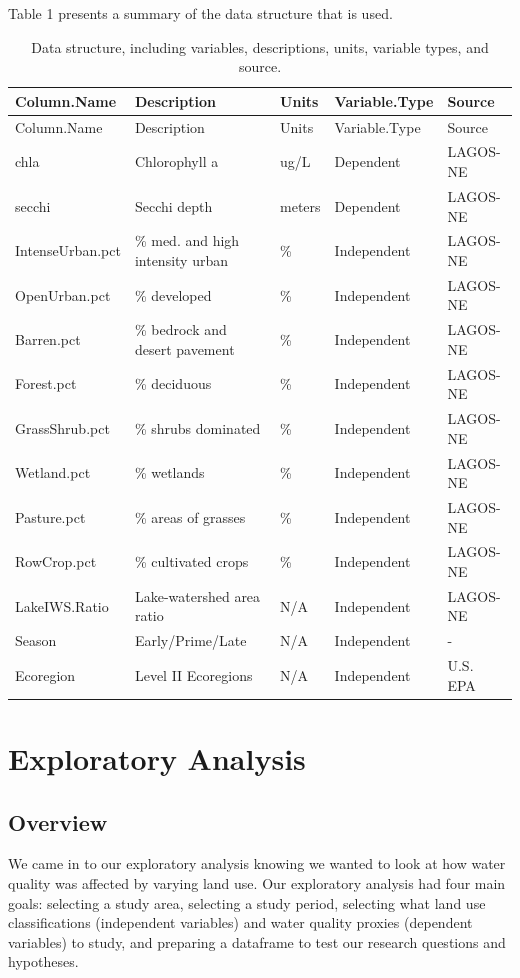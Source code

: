 \documentclass[12pt,]{article}
\begin{document}
Table 1 presents a summary of the data structure that is used.

\begin{longtable}[]{@{}lllll@{}}
\caption{Data structure, including variables, descriptions, units,
variable types, and source.}\tabularnewline
\toprule
Column.Name & Description & Units & Variable.Type &
Source\tabularnewline
\midrule
\endfirsthead
\toprule
Column.Name & Description & Units & Variable.Type &
Source\tabularnewline
\midrule
\endhead
chla & Chlorophyll a & ug/L & Dependent & LAGOS-NE\tabularnewline
secchi & Secchi depth & meters & Dependent & LAGOS-NE\tabularnewline
IntenseUrban.pct & \% med. and high intensity urban & \% & Independent &
LAGOS-NE\tabularnewline
OpenUrban.pct & \% developed & \% & Independent &
LAGOS-NE\tabularnewline
Barren.pct & \% bedrock and desert pavement & \% & Independent &
LAGOS-NE\tabularnewline
Forest.pct & \% deciduous & \% & Independent & LAGOS-NE\tabularnewline
GrassShrub.pct & \% shrubs dominated & \% & Independent &
LAGOS-NE\tabularnewline
Wetland.pct & \% wetlands & \% & Independent & LAGOS-NE\tabularnewline
Pasture.pct & \% areas of grasses & \% & Independent &
LAGOS-NE\tabularnewline
RowCrop.pct & \% cultivated crops & \% & Independent &
LAGOS-NE\tabularnewline
LakeIWS.Ratio & Lake-watershed area ratio & N/A & Independent &
LAGOS-NE\tabularnewline
Season & Early/Prime/Late & N/A & Independent & -\tabularnewline
Ecoregion & Level II Ecoregions & N/A & Independent & U.S.
EPA\tabularnewline
\bottomrule
\end{longtable}

\newpage

\hypertarget{exploratory-analysis}{%
\section{Exploratory Analysis}\label{exploratory-analysis}}

\hypertarget{overview}{%
\subsection{Overview}\label{overview}}

We came in to our exploratory analysis knowing we wanted to look at how
water quality was affected by varying land use. Our exploratory analysis
had four main goals: selecting a study area, selecting a study period,
selecting what land use classifications (independent variables) and
water quality proxies (dependent variables) to study, and preparing a
dataframe to test our research questions and hypotheses.
\end{document}
